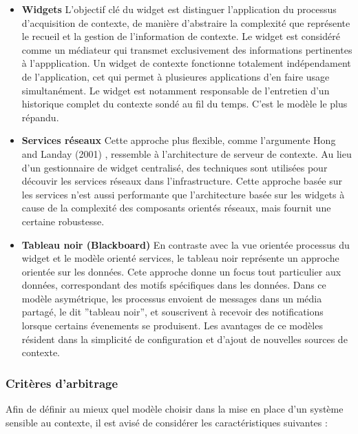\begin{itemize}
        \item \textbf{Widgets}
		L'objectif clé du widget est distinguer l'application du
		processus d'acquisition de contexte, de manière d'abstraire la
		complexité que représente le recueil et la gestion de
		l'information de contexte. Le widget est considéré comme un
		médiateur qui transmet exclusivement des informations
		pertinentes à l'appplication. Un widget de contexte fonctionne
		totalement indépendament de l'application, cet qui permet à
		plusieures applications d'en faire usage simultanément. Le
		widget est notamment responsable de l'entretien d'un historique
		complet du contexte sondé au fil du temps. C'est le modèle le
		plus répandu.

        \item \textbf{Services réseaux}
		Cette approche plus flexible, comme l'argumente Hong
		and Landay (2001) \cite{hong_infrastructure_2001}, ressemble à
		l'architecture de serveur de contexte. Au lieu d'un
		gestionnaire de widget centralisé, des techniques sont utilisées
		pour découvir les services réseaux dans l'infrastructure. Cette
		approche basée sur les services n'est aussi performante que
		l'architecture basée sur les widgets à cause de la complexité
		des composants orientés réseaux, mais fournit une certaine
		robustesse.

	\item \textbf{Tableau noir (Blackboard)}
                En contraste avec la vue orientée processus du widget et le
		modèle orienté services, le tableau noir représente un approche
		orientée sur les données. Cete approche donne un focus tout
		particulier aux données, correspondant des motifs spécifiques
		dans les données. Dans ce modèle asymétrique, les processus
		envoient de messages dans un média partagé, le dit ''tableau
		noir'', et souscrivent à recevoir des notifications lorsque
		certains évenements se produisent. Les avantages de ce modèles
		résident dans la simplicité de configuration et d'ajout de
		nouvelles sources de contexte.
\end{itemize}

\subsubsection{Critères d'arbitrage}

Afin de définir au mieux quel modèle choisir dans la mise en place d'un système
sensible au contexte, il est avisé de considérer les caractéristiques suivantes
:

